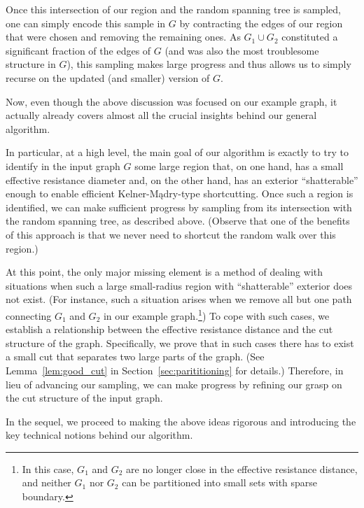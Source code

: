 \documentclass[11pt, letterpaper]{article}
\begin{document}
Once this intersection of our region and the random spanning tree is sampled, one can simply encode this sample in $G$ by contracting the edges of our region that were chosen and removing the remaining ones. As $G_1\cup G_2$ constituted a significant fraction of the edges of $G$ (and was also the most troublesome structure in $G$), this sampling makes large progress and thus allows us to simply recurse on the updated (and smaller) version of $G$.  

Now, even though the above discussion was focused on our example graph, it actually already covers almost all the crucial insights behind our general algorithm. 

In particular, at a high level, the main goal of our algorithm is exactly to try to identify in the input graph $G$ some large region that, on one hand, has a small effective resistance diameter and, on the other hand, has an exterior ``shatterable'' enough to enable efficient Kelner-Mądry-type shortcutting. Once such a region is identified, we can make sufficient progress by sampling from its intersection with the random spanning tree, as described above. (Observe that one of the benefits of this approach is that we never need to shortcut the random walk over this region.)

At this point, the only major missing element is a method of dealing with situations when such a large small-radius region with ``shatterable'' exterior does not exist. (For instance, such a situation arises when we remove all but one path connecting $G_1$ and $G_2$ in our example graph.\footnote{In this case, $G_1$ and $G_2$ are no longer close in the effective resistance distance, and neither $G_1$ nor $G_2$ can be partitioned into small sets with sparse boundary.}) To cope with such cases, we establish a relationship between the effective resistance distance and the cut structure of the graph. Specifically, we prove that in such cases there has to exist a small cut that separates two large parts of the graph. (See Lemma~\ref{lem:good_cut} in Section~\ref{sec:parititioning} for details.) Therefore, in lieu of advancing our sampling, we can make progress by refining our grasp on the cut structure of the input graph. 

In the sequel, we proceed to making the above ideas rigorous and introducing the key technical notions behind our algorithm.
\end{document}
